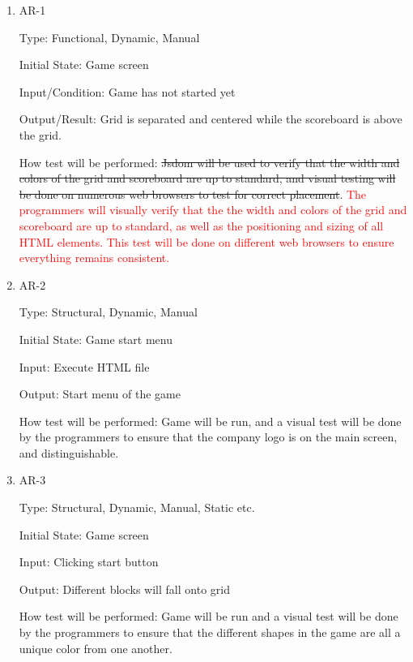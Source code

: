 \documentclass[12pt, titlepage]{article}
\begin{document}
\begin{enumerate}

\item{AR-1\\}

Type: Functional, Dynamic, Manual
					
Initial State: Game screen 
					
Input/Condition: Game has not started yet  
					
Output/Result: Grid is separated and centered while the scoreboard is above the grid.
					
How test will be performed: \sout{Jsdom will be used to verify that the width and colors of the grid and scoreboard are up to standard, and visual testing will be done on numerous web browsers to test for correct placement}. \textcolor{red}{The programmers will visually verify that the the width and colors of the grid and scoreboard are up to standard, as well as the positioning and sizing of all HTML elements. This test will be done on different web browsers to ensure everything remains consistent.}
					
\item{AR-2\\}

Type: Structural, Dynamic, Manual
					
Initial State: Game start menu
					
Input: Execute HTML file
					
Output: Start menu of the game
					
How test will be performed: Game will be run, and a visual test will be done by the programmers to ensure that the company logo is on the main screen, and distinguishable. 

\item{AR-3\\}

Type: Structural, Dynamic, Manual, Static etc.
					
Initial State: Game screen
					
Input: Clicking start button 
					
Output: Different blocks will fall onto grid
					
How test will be performed: Game will be run and a visual test will be done by the programmers to ensure that the different shapes in the game are all a unique color from one another. 

\end{enumerate}
\end{document}
